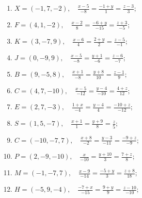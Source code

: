 	\vspace{10pt}
	\begin{enumerate}
		\setcounter{enumi}{\value{tasks}}

			\item \( \displaystyle X = \left( -1, 7, -2 \right), \quad \frac{x-5}{-8} = \frac{-1+y}{1} = \frac{z-3}{3} \);
			\item \( \displaystyle F = \left( 4, 1, -2 \right), \quad \frac{x-2}{8} = \frac{-6+y}{-15} = \frac{z+3}{-5} \);
			\item \( \displaystyle K = \left( 3, -7, 9 \right), \quad \frac{x-6}{4} = \frac{2+y}{2} = \frac{z-5}{-1} \);
			\item \( \displaystyle J = \left( 0, -9, 9 \right), \quad \frac{x-5}{-8} = \frac{y+1}{-6} = \frac{z-6}{-7} \);
			\item \( \displaystyle B = \left( 9, -5, 8 \right), \quad \frac{x+1}{-8} = \frac{y+8}{10} = \frac{z-1}{9} \);
			\item \( \displaystyle C = \left( 4, 7, -10 \right), \quad \frac{x-5}{-12} = \frac{y-4}{-10} = \frac{4+z}{12} \);
			\item \( \displaystyle E = \left( 2, 7, -3 \right), \quad \frac{1+x}{-4} = \frac{y-4}{4} = \frac{-10+z}{-12} \);
			\item \( \displaystyle S = \left( 1, 5, -7 \right), \quad \frac{x+1}{1} = \frac{y+9}{8} = \frac{z}{5} \);
			\item \( \displaystyle C = \left( -10, -7, 7 \right), \quad \frac{x+8}{-2} = \frac{y-3}{-11} = \frac{-9+z}{-9} \);
			\item \( \displaystyle P = \left( 2, -9, -10 \right), \quad \frac{x}{-10} = \frac{y+10}{3} = \frac{7+z}{8} \);
			\item \( \displaystyle M = \left( -1, -7, 7 \right), \quad \frac{x-9}{-14} = \frac{-5+y}{3} = \frac{z+8}{18} \);
			\item \( \displaystyle H = \left( -5, 9, -4 \right), \quad \frac{-7+x}{-15} = \frac{9+y}{9} = \frac{z-10}{-10} \);

		\setcounter{tasks}{\value{enumi}}
	\end{enumerate}